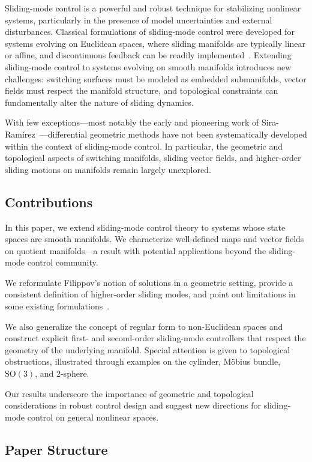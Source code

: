 \documentclass{article}
\theoremstyle{definition}
\theoremstyle{remark}
\newcommand{\SO}{\mathrm{SO}} %
\begin{document}
Sliding-mode control is a powerful and robust technique for stabilizing nonlinear systems, particularly in the presence of
model uncertainties and external disturbances. Classical formulations of sliding-mode control were developed for systems
evolving on Euclidean spaces, where sliding manifolds are typically linear or affine, and discontinuous feedback can be readily
implemented~\cite{utkin,shtessel}. Extending sliding-mode control to systems evolving on smooth manifolds introduces new
challenges: switching surfaces must be modeled as embedded submanifolds, vector fields must respect the manifold structure,
and topological constraints can fundamentally alter the nature of sliding dynamics.

With few exceptions---most notably the early and pioneering work of Sira-Ram\'irez~\cite{sira1988}---differential geometric methods
have not been systematically developed within the context of sliding-mode control. In particular, the geometric and topological
aspects of switching manifolds, sliding vector fields, and higher-order sliding motions on manifolds remain largely unexplored.

\subsection{Contributions}

In this paper, we extend sliding-mode control theory to systems whose state spaces are smooth manifolds. We characterize
well-defined maps and vector fields on quotient manifolds---a result with potential applications beyond the sliding-mode control community.

We reformulate Filippov's notion of solutions in a geometric setting, provide a consistent definition of higher-order sliding modes,
and point out limitations in some existing formulations~\cite{utkin3,utkin2020}.

We also generalize the concept of regular form to non-Euclidean spaces and construct explicit first- and second-order sliding-mode
controllers that respect the geometry of the underlying manifold. Special attention is given to topological obstructions, illustrated
through examples on the cylinder, M\"obius bundle, $\SO(3)$, and 2-sphere.

Our results underscore the importance of geometric and topological considerations in robust control design and suggest new directions
for sliding-mode control on general nonlinear spaces.

\subsection{Paper Structure}
\end{document}
